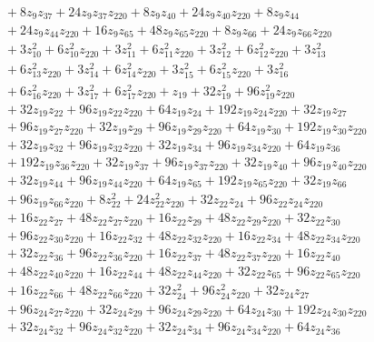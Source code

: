 \begin{align*}
&\quad{}+8z_{9} z_{37}+24z_{9} z_{37} z_{220}+8z_{9} z_{40}+24z_{9} z_{40} z_{220}+8z_{9} z_{44}\\
&\quad{}+24z_{9} z_{44} z_{220}+16z_{9} z_{65}+48z_{9} z_{65} z_{220}+8z_{9} z_{66}+24z_{9} z_{66} z_{220}\\
&\quad{}+3z_{10}^{2}+6z_{10}^{2} z_{220}+3z_{11}^{2}+6z_{11}^{2} z_{220}+3z_{12}^{2}+6z_{12}^{2} z_{220}+3z_{13}^{2}\\
&\quad{}+6z_{13}^{2} z_{220}+3z_{14}^{2}+6z_{14}^{2} z_{220}+3z_{15}^{2}+6z_{15}^{2} z_{220}+3z_{16}^{2}\\
&\quad{}+6z_{16}^{2} z_{220}+3z_{17}^{2}+6z_{17}^{2} z_{220}+z_{19}+32z_{19}^{2}+96z_{19}^{2} z_{220}\\
&\quad{}+32z_{19} z_{22}+96z_{19} z_{22} z_{220}+64z_{19} z_{24}+192z_{19} z_{24} z_{220}+32z_{19} z_{27}\\
&\quad{}+96z_{19} z_{27} z_{220}+32z_{19} z_{29}+96z_{19} z_{29} z_{220}+64z_{19} z_{30}+192z_{19} z_{30} z_{220}\\
&\quad{}+32z_{19} z_{32}+96z_{19} z_{32} z_{220}+32z_{19} z_{34}+96z_{19} z_{34} z_{220}+64z_{19} z_{36}\\
&\quad{}+192z_{19} z_{36} z_{220}+32z_{19} z_{37}+96z_{19} z_{37} z_{220}+32z_{19} z_{40}+96z_{19} z_{40} z_{220}\\
&\quad{}+32z_{19} z_{44}+96z_{19} z_{44} z_{220}+64z_{19} z_{65}+192z_{19} z_{65} z_{220}+32z_{19} z_{66}\\
&\quad{}+96z_{19} z_{66} z_{220}+8z_{22}^{2}+24z_{22}^{2} z_{220}+32z_{22} z_{24}+96z_{22} z_{24} z_{220}\\
&\quad{}+16z_{22} z_{27}+48z_{22} z_{27} z_{220}+16z_{22} z_{29}+48z_{22} z_{29} z_{220}+32z_{22} z_{30}\\
&\quad{}+96z_{22} z_{30} z_{220}+16z_{22} z_{32}+48z_{22} z_{32} z_{220}+16z_{22} z_{34}+48z_{22} z_{34} z_{220}\\
&\quad{}+32z_{22} z_{36}+96z_{22} z_{36} z_{220}+16z_{22} z_{37}+48z_{22} z_{37} z_{220}+16z_{22} z_{40}\\
&\quad{}+48z_{22} z_{40} z_{220}+16z_{22} z_{44}+48z_{22} z_{44} z_{220}+32z_{22} z_{65}+96z_{22} z_{65} z_{220}\\
&\quad{}+16z_{22} z_{66}+48z_{22} z_{66} z_{220}+32z_{24}^{2}+96z_{24}^{2} z_{220}+32z_{24} z_{27}\\
&\quad{}+96z_{24} z_{27} z_{220}+32z_{24} z_{29}+96z_{24} z_{29} z_{220}+64z_{24} z_{30}+192z_{24} z_{30} z_{220}\\
&\quad{}+32z_{24} z_{32}+96z_{24} z_{32} z_{220}+32z_{24} z_{34}+96z_{24} z_{34} z_{220}+64z_{24} z_{36}\\

\end{align*}
